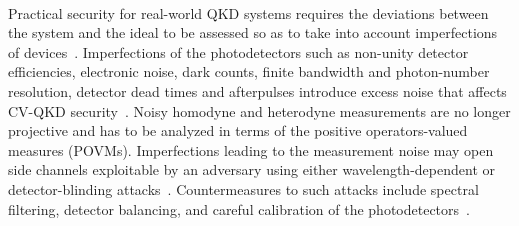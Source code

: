\documentclass[%
reprint,
superscriptaddress,
 amsmath,amssymb,amsfonts,
 aps,
 pra,
 longbibliography
]{revtex4-2}
\begin{document}
~%

Practical security
for real-world QKD systems
requires
 the deviations between the system and the
ideal to be assessed 
so as to take into account
imperfections of devices~\cite{Scarani:rmp:2009,Xu:rmp:2020}.
Imperfections of the photodetectors
such as
non-unity detector efficiencies,
electronic noise, dark counts, finite bandwidth and
photon-number resolution, detector dead times
and afterpulses
introduce excess
noise that affects CV-QKD
security~\cite{Chi:njp:2011,Jouguet:pra:2012,Wang:prappl:2019,Lupo:prxq:2022,Semenov:pra:2024,hajomer2025finite,Oruganti:qst:2025}.
Noisy homodyne and heterodyne measurements are
no longer projective and has to be analyzed in terms of
the positive operators-valued measures (POVMs).
Imperfections leading to the measurement noise
may open side channels exploitable by an adversary
using either wavelength-dependent or detector-blinding
attacks~\cite{huang2012wavelength,huang2014quantum,qin2018homodyne,qin2016quantum}.
Countermeasures to such attacks include spectral filtering, detector balancing, and
careful calibration of the photodetectors~\cite{Zou:optexp:2022,Wang:jlt:2023,Pan:pra:2025}.



\end{document}
